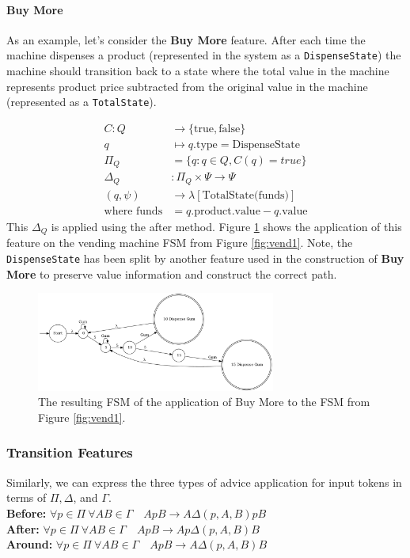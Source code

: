 \documentclass[sigplan,anonymous,review]{acmart}
\begin{document}
\paragraph{Buy More} As an example, let's consider the \textbf{Buy More} feature. After each time the machine dispenses a product (represented in the system as a \texttt{DispenseState}) the machine should transition back to a state where the total value in the machine represents product price subtracted from the original value in the machine (represented as a \texttt{TotalState}).

\begin{align*}
C: Q &\rightarrow \{\mathrm{true},\mathrm{false}\}\\
q &\mapsto q.\text{type} = \text{DispenseState} \\
\Pi_Q &= \{q: q \in Q, C(q) = true\}\\
\Delta_Q &: \Pi_Q \times \Psi \rightarrow \Psi\\
(q, \psi) &\rightarrow \lambda[\text{TotalState(funds)}] \\
\text{where funds} &= q.\text{product.value} - q.\text{value}
\end{align*}
This $\Delta_Q$ is applied using the after method. Figure \ref{fig:vend2} shows the application of this feature on the vending machine FSM from Figure \ref{fig:vend1}. Note, the \texttt{DispenseState} has been split by another feature used in the construction of \textbf{Buy More} to preserve value information and construct the correct path.

\begin{figure}
    \centering
    \includegraphics[width=0.7\textwidth]{figures/vend2.pdf}
    \caption{The resulting FSM of the application of Buy More to the FSM from Figure \ref{fig:vend1}.}
    \label{fig:vend2}
\end{figure}

\subsubsection{Transition Features}
Similarly, we can express the three types of advice application for input tokens in terms of $\Pi, \Delta$, and $\Gamma$.\\
\textbf{Before:} $\forall p \in \Pi \ \forall AB \in \Gamma \quad A p B \rightarrow A \Delta(p, A, B)pB$\\
\textbf{After:} $\forall p \in \Pi \ \forall AB \in \Gamma \quad A p B \rightarrow A p \Delta(p, A, B)B$\\
\textbf{Around:} $\forall p \in \Pi \ \forall AB \in \Gamma \quad A p B \rightarrow A  \Delta(p, A, B)B$
\end{document}
